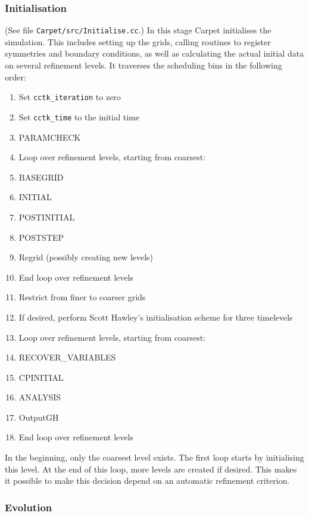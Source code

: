 \documentclass{article}
\begin{document}
\subsubsection{Initialisation}

   (See file \texttt{Carpet/src/Initialise.cc}.)  In this stage Carpet
   initialises the simulation.  This includes setting up the grids,
   calling routines to register symmetries and boundary conditions, as
   well as calculating the actual initial data on several refinement
   levels.  It traverses the scheduling bins in the following order:
\begin{enumerate}
\itemsep 0pt
\item
   Set \texttt{cctk\_iteration} to zero
\item
   Set \texttt{cctk\_time} to the initial time
\item
   PARAMCHECK
\item
   Loop over refinement levels, starting from coarsest:
\item \quad
   BASEGRID
\item \quad
   INITIAL
\item \quad
   POSTINITIAL
\item \quad
   POSTSTEP
\item \quad
   Regrid (possibly creating new levels)
\item
   End loop over refinement levels
\item
   Restrict from finer to coarser grids
\item
   If desired, perform Scott Hawley's initialisation scheme for three
   timelevels
\item
   Loop over refinement levels, starting from coarsest:
\item \quad
   RECOVER\_VARIABLES
\item \quad
   CPINITIAL
\item \quad
   ANALYSIS
\item \quad
   OutputGH
\item
   End loop over refinement levels
\end{enumerate}

   In the beginning, only the coarsest level exists.  The first loop
   starts by initialising this level.  At the end of this loop, more
   levels are created if desired.  This makes it possible to make this
   decision depend on an automatic refinement criterion.



\subsubsection{Evolution}
\end{document}
